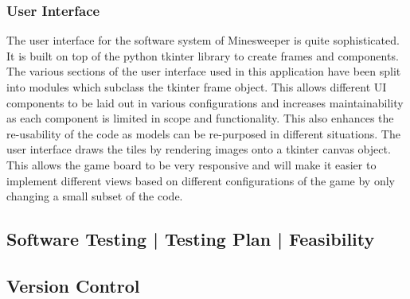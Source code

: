 \documentclass[12pt, a4]{report}
\begin{document}
\subsubsection{User Interface}
The user interface for the software system of Minesweeper is quite sophisticated. It is built on top of the python tkinter library to create frames and components. The various sections of the user interface used in this application have been split into modules which subclass the tkinter frame object. This allows different UI components to be laid out in various configurations and increases maintainability as each component is limited in scope and functionality. This also enhances the re-usability of the code as models can be re-purposed in different situations. The user interface draws the tiles by rendering images onto a tkinter canvas object. This allows the game board to be very responsive and will make it easier to implement different views based on different configurations of the game by only changing a small subset of the code.

\subsection{Software Testing | Testing Plan | Feasibility}
\par 

\subsection{Version Control}



	
	
	

\end{document}
